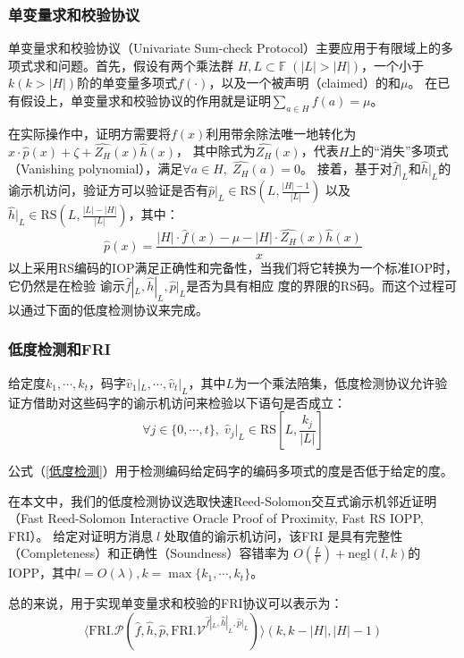 \documentclass[zihao=-4]{ctexart}
\begin{document}
\begin{spacing}{1.5}
\subsubsection{单变量求和校验协议}
单变量求和校验协议（Univariate Sum-check Protocol）主要应用于有限域上的多项式求和问题。首先，假设有两个乘法群
$H, L\subset \mathbb{F}\;(|L|>|H|)$，一个小于$k(k>|H|)$阶的单变量多项式$f(\cdot)$，以及一个被声明（claimed）的和$\mu$。
在已有假设上，单变量求和校验协议的作用就是证明$\sum_{a\in H}f(a)=\mu$。\par
在实际操作中，证明方需要将$f(x)$利用带余除法唯一地转化为$x\cdot\hat{p}(x)+\zeta+\hat{Z_H}(x)\hat{h}(x)$，
其中除式为$\hat{Z_H}(x)$，代表$H$上的“消失”多项式（Vanishing polynomial），满足$\forall a\in H,\;\hat{Z_H}(a)=0$。
接着，基于对$\hat{f}|_L$和$\hat{h}|_L$的谕示机访问，验证方可以验证是否有$\hat{p}|_L\in\text{RS}(L,\frac{|H|-1}{|L|})$
以及$\hat{h}|_L\in\text{RS}(L,\frac{|L|-|H|}{|L|})$，其中：
\begin{equation}\hat{p}(x)=\dfrac{|H|\cdot\hat{f}(x)-\mu-|H|\cdot\hat{Z_H}(x)\hat{h}(x)}{x}\end{equation}
以上采用RS编码的IOP满足正确性和完备性，当我们将它转换为一个标准IOP时，它仍然是在检验
谕示$\hat{f}|_L,\hat{h}|_L,\hat{p}|_L$是否为具有相应
度的界限的RS码。而这个过程可以通过下面的低度检测协议来完成。

\subsubsection{低度检测和FRI}
给定度$k_1,\cdots,k_t$，码字$\hat{v}_1|_L,\cdots,\hat{v}_t|_L$，其中$L$为一个乘法陪集，低度检测协议允许验证方借助对这些码字的谕示机访问来检验以下语句是否成立：
\begin{equation}\forall j\in\{0,\cdots,t\},\;\hat{v}_j|_L\in\text{RS}[L,\frac{k_j}{|L|}]\label{低度检测}\end{equation}\par
公式（\ref{低度检测}）用于检测编码给定码字的编码多项式的度是否低于给定的度。\par
在本文中，我们的低度检测协议选取快速Reed-Solomon交互式谕示机邻近证明（Fast Reed-Solomon Interactive Oracle Proof of Proximity, Fast RS IOPP, FRI）。
给定对证明方消息$\;l\;$处取值的谕示机访问，该FRI 是具有完整性（Completeness）和正确性（Soundness）容错率为
$O(\frac{L}{\mathbb{F}})+\text{negl}(l,k)$的IOPP，其中$l=O(\lambda),k=\max\{k_1,\cdots,k_t\}$。\par
总的来说，用于实现单变量求和校验的FRI协议可以表示为：
\begin{equation}\langle \text{FRI}.\mathcal{P}(\hat{f},\hat{h},\hat{p},\text{FRI}.\mathcal{V}^{\hat{f}|_L,\hat{h}|_L,\hat{p}|_L})\rangle(k,k-|H|,|H|-1)\end{equation}\par


\end{spacing}
\end{document}
